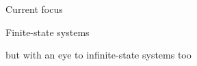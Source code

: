 \documentclass[10pt,aspectratio=149]{beamer}
\begin{document}

\begin{frame}{Current focus}
\Large
\centering

\alert{Finite-state} systems
\bigskip
\bigskip
\pause

but with an eye to \alert{infinite-state} systems too

\end{frame}


%
%

\end{document}
